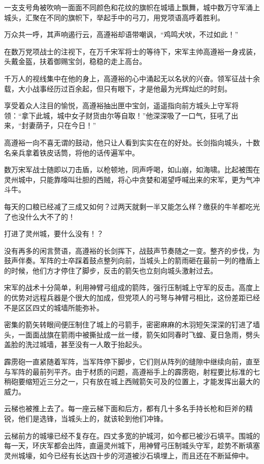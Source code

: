 一支支号角被吹响一面面不同颜色和花纹的旗帜在城墙上飘舞，城中数万守军涌上城头，汇聚在不同的旗帜下，举起手中的弓刀，用党项语高呼着胜利。

万众共一呼，其声响遏行云，高遵裕却语带嘲讽，“鸡鸣犬吠，不过如此！”

在数万党项战士的注视下，在万千宋军将士的等待下，宋军主帅高遵裕一身戎装，头戴金盔，扶着御赐宝剑，稳稳的走上高台。

千万人的视线集中在他的身上，高遵裕的心中涌起无以名状的兴奋。领军征战十余载，大小战事经历过百余起，但只有眼下，才是他最为光辉灿烂的时刻。

享受着众人注目的愉悦，高遵裕抽出匣中宝剑，遥遥指向前方城头上守军将领：“拿下此城，城中女子财货由尔等自取！”他深深吸了一口气，狂吼了出来，“封妻荫子，只在今日！”

高遵裕一向不喜无谓的鼓动，他只让人看到实实在在的好处。长剑指向城头，十数名亲兵拿着铁皮话筒，将他的话传遍军中。

数万宋军战士随即以刀击盾，以枪顿地，同声呼喝，如山崩，如海啸。比起被围在灵州城中，只能靠嚎叫壮胆的西贼，将心中贪婪和渴望呼喊出来的宋军，更为气冲斗牛。

每天的口粮已经减了三成又如何？过两天就剩一半又能怎么样？缴获的牛羊都吃光了也没什么大不了的！

打进了灵州城，要什么没有！？

没有再多的闲言赘语，高遵裕的长剑挥下，战鼓声节奏随之一变。整齐的步伐，为鼓声伴奏。军阵的士卒踩着鼓点整列向前，当城头上的箭雨砸在最前一列的橹盾上的时候，他们方才停住了脚步，反击的箭矢也立刻向城头激射过去。

宋军的战术十分简单，利用神臂弓组成的箭阵，强行压制城上守军的反击。高度上的优势对远程兵器是个很大的加成，但党项人的弓弩与神臂弓相比，这份差距已经不是区区四丈的城墙所能弥补。

密集的箭矢转眼间便压制住了城上的弓箭手，密密麻麻的木羽短矢深深的钉进了墙头，一面面战旗在箭雨中被撕扯成一丝一缕，箭矢如同春时飞蝗、夏日急雨，劈头盖脸的洗过城墙，甚至没有一人敢于抬起头。

霹雳砲一直紧随着军阵，当军阵停下脚步，它们则从阵列的缝隙中继续向前，直至与军阵的最前列平齐。由于材质的问题，高遵裕手上的霹雳砲，射程要比标准的七稍砲要缩短近三分之一，只有放在城上西贼箭矢可及的位置上，才能发挥出最大的威力。

云梯也被推上去了。每一座云梯下面和后方，都有几十多名手持长枪和巨斧的精锐，他们是选锋，当城头上的，就该轮到他们冲锋。

云梯前方的城壕已经不复存在。四丈多宽的护城河，如今都已被沙石填平。围城的每一天，环庆军都会出阵，直逼灵州城下，用神臂弓压制城头守军，趁势不断填塞灵州城壕，如今已经有长达四十步的河道被沙石填埋上，而且还在不断延伸中。

